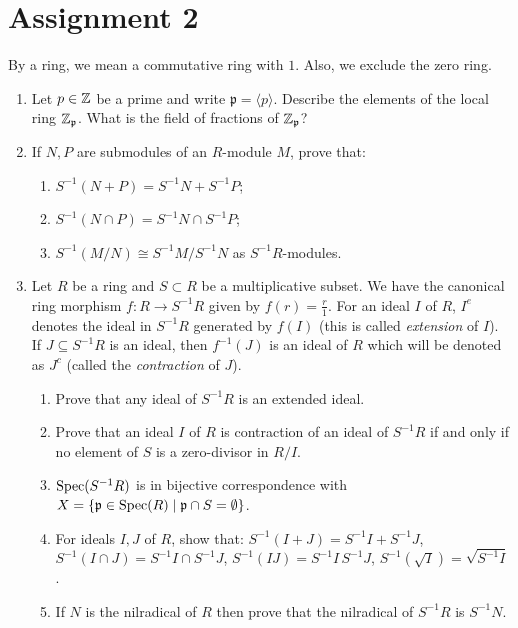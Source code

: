 \section{Assignment 2}

\begin{convention}
By a ring, we mean a commutative ring with $1$. Also, we exclude the zero ring.
\end{convention}

\begin{enumerate}[label=\arabic*.]

\item Let $p \in \mathbb{Z}$ be a prime and write $\mathfrak p = \langle p \rangle$. Describe the elements of the local ring $\mathbb{Z}_{\mathfrak p}$. What is the field of fractions of $\mathbb{Z}_{\mathfrak p}$?

\item If $N,P$ are submodules of an $R$-module $M$, prove that:
\begin{enumerate}[label=(\alph*)]
    \item $S^{-1}(N+P) = S^{-1}N + S^{-1}P$;
    \item $S^{-1}(N\cap P) = S^{-1}N \cap S^{-1}P$;
    \item $S^{-1}(M/N) \cong S^{-1}M/S^{-1}N$ as $S^{-1}R$-modules.
\end{enumerate}

\item Let $R$ be a ring and $S \subset R$ be a multiplicative subset. We have the canonical ring morphism $f: R \to S^{-1}R$ given by $f(r) = \frac r1$. For an ideal $I$ of $R$, $I^e$ denotes the ideal in $S^{-1}R$ generated by $f(I)$ (this is called \emph{extension} of $I$). If $J \subseteq S^{-1}R$ is an ideal, then $f^{-1}(J)$ is an ideal of $R$ which will be denoted as $J^c$ (called the \emph{contraction} of $J$).
\begin{enumerate}[label=(\alph*)]
    \item Prove that any ideal of $S^{-1}R$ is an extended ideal.
    \item Prove that an ideal $I$ of $R$ is contraction of an ideal of $S^{-1}R$ if and only if no element of $S$ is a zero-divisor in $R/I$.
    \item $\operatorname{Spec}(S^{-1}R)$ is in bijective correspondence with $X = \{\mathfrak p \in \operatorname{Spec}(R) \mid \mathfrak p \cap S = \emptyset\}$.
    \item For ideals $I,J$ of $R$, show that: $S^{-1}(I+J) = S^{-1}I + S^{-1}J$, $S^{-1}(I \cap J) = S^{-1}I \cap S^{-1}J$, $S^{-1}(IJ) = S^{-1}I\, S^{-1}J$, $S^{-1}(\sqrt I) = \sqrt{S^{-1}I}$.
    \item If $N$ is the nilradical of $R$ then prove that the nilradical of $S^{-1}R$ is $S^{-1}N$.
\end{enumerate}


\end{enumerate}
